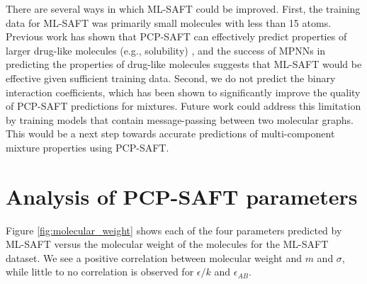 There are several ways in which ML-SAFT could be improved. First, the training data for ML-SAFT was primarily small molecules with less than 15 atoms. Previous work has shown that PCP-SAFT can effectively predict properties of larger drug-like molecules (e.g., solubility) \cite{Klajmon2020}, and the success of MPNNs in predicting the properties of drug-like molecules suggests that ML-SAFT would be effective given sufficient training data. Second, we do not predict the binary interaction coefficients, which has been shown to significantly improve the quality of PCP-SAFT predictions for mixtures. Future work could address this limitation by training models that contain message-passing between two molecular graphs. This would be a next step towards accurate predictions of multi-component mixture properties using PCP-SAFT.

\section{Analysis of PCP-SAFT parameters}\label{app:sensitivity}





Figure \ref{fig:molecular_weight} shows each of the four parameters predicted by ML-SAFT versus the molecular weight of the molecules for the ML-SAFT dataset. We see a positive correlation between molecular weight and $m$ and $\sigma$, while little to no correlation is observed for $\epsilon/k$ and $\epsilon_{AB}$.

